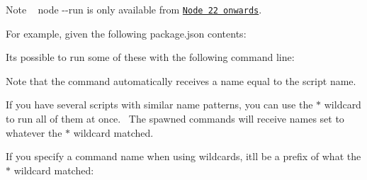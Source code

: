 \begin{DoxyNote}{Note}
~\newline
 {\ttfamily node -\/-\/run} is only available from \href{https://nodejs.org/en/blog/announcements/v22-release-announce\#running-packagejson-scripts}{\texttt{Node 22 onwards}}.
\end{DoxyNote}
For example, given the following {\ttfamily package.\+json} contents\+:


\begin{DoxyCode}{0}
\DoxyCodeLine{\{}
\DoxyCodeLine{\ \ \}}
\DoxyCodeLine{\}}

\end{DoxyCode}


It\textquotesingle{}s possible to run some of these with the following command line\+:


\begin{DoxyCode}{0}

\end{DoxyCode}


Note that the command automatically receives a name equal to the script name.

If you have several scripts with similar name patterns, you can use the {\ttfamily \texorpdfstring{$\ast$}{*}} wildcard to run all of them at once.~\newline
 The spawned commands will receive names set to whatever the {\ttfamily \texorpdfstring{$\ast$}{*}} wildcard matched.


\begin{DoxyCode}{0}

\end{DoxyCode}


If you specify a command name when using wildcards, it\textquotesingle{}ll be a prefix of what the {\ttfamily \texorpdfstring{$\ast$}{*}} wildcard matched\+:


